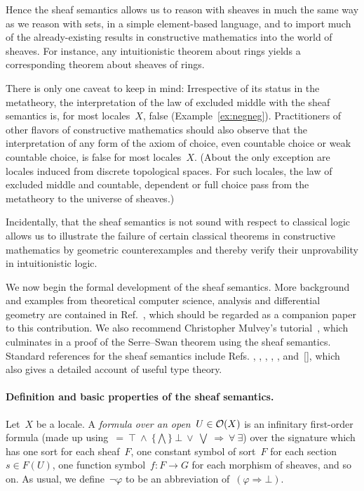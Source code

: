 \documentclass{ws-rv9x6}
\begin{document}
{Hence the sheaf semantics allows us to reason with sheaves in much the same way
as we reason with sets, in a simple element-based language, and to import much
of the already-existing results in constructive mathematics into the world of
sheaves. For instance, any intuitionistic theorem about rings yields a
corresponding theorem about sheaves of rings.

There is only one caveat to keep in mind: Irrespective of its status in the
metatheory, the interpretation of the law of excluded middle with the sheaf
semantics is, for most locales~$X$, false (Example~\ref{ex:negneg}).
Practitioners of other flavors of constructive mathematics should also observe
that the interpretation of any form of the axiom of choice, even countable
choice or weak countable choice, is false for most locales~$X$. (About the only
exception are locales induced from discrete topological spaces. For such
locales, the law of excluded middle and countable, dependent or full choice
pass from the metatheory to the universe of sheaves.)

Incidentally, that the sheaf semantics is not sound with respect to classical
logic allows us to illustrate the failure of certain classical theorems in
constructive mathematics by geometric counterexamples and thereby verify their
unprovability in intuitionistic logic.

We now begin the formal development of the sheaf semantics. More background and
examples from theoretical computer science, analysis and differential geometry
are contained in Ref.~, which should be
regarded as a companion paper to this contribution. We also recommend
Christopher Mulvey's tutorial~\cite{mulvey:repr}, which culminates in a proof
of the Serre--Swan theorem using the sheaf semantics. Standard references for
the sheaf semantics include Refs.
\cite[Chapter~VI]{moerdijk-maclane:sheaves-logic},
\cite[Chapter~14]{goldblatt:topoi},
\cite[Section~5]{caramello:preliminaries},
\cite[Sections~12--15]{streicher:ctcl},
\cite[Chapter~6]{borceux:handbook3},
\cite[Part~D]{johnstone:elephant} and~[],
which also gives a detailed account of useful type theory.

\paragraph{Definition and basic properties of the sheaf semantics.}
Let~$X$ be a locale. A \emph{formula over an open~$U \in \mathcal{O}(X)$} is an
infinitary first-order formula (made up using~${=}\ {\top}\ {\wedge}\ \{\bigwedge\}\ {\bot}\ {\vee}\
{\bigvee}\ {\Rightarrow}\ {\forall}\ {\exists}$) over the signature which has one sort for
each sheaf~$F$, one constant symbol of sort~$F$ for each section~$s \in F(U)$,
one function symbol~$f : F \to G$ for each morphism of sheaves, and so on. As
usual, we define~$\neg\varphi$ to be an abbreviation of~$(\varphi \Rightarrow
\bot)$.

}
\end{document}
